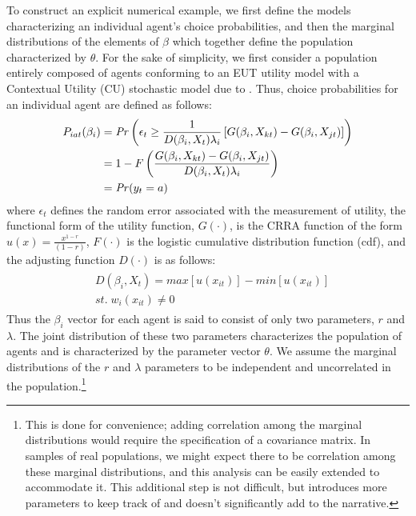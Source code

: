 \documentclass[../main.tex]{subfiles}
\begin{document}
To construct an explicit numerical example, we first define the models characterizing an individual agent's choice probabilities, and then the marginal distributions of the elements of $\beta$ which together define the population characterized by $\theta$.
For the sake of simplicity, we first consider a population entirely composed of agents conforming to an EUT utility model with a Contextual Utility (CU) stochastic model due to \textcite{Wilcox2008}.
Thus, choice probabilities for an individual agent are defined as follows:
\begin{align}
	\label{eq3:RE}
	\begin{split}
	P_{iat}(\beta_i) &= {\mathit{Pr}}\left(  \epsilon_t \geq \frac{1}{D(\beta_i,X_t) \lambda_i} \left[ G(\beta_i,X_{kt}) - G(\beta_i,X_{jt}) \right] \right)\\
	&= 1 - F\left( \dfrac{G(\beta_i,X_{kt}) - G(\beta_i,X_{jt})}{D(\beta_i,X_t)\lambda_i }  \right)\\
	&= {\mathit{Pr}}(y_t = a)
	\end{split}
\end{align}
\noindent where $\epsilon_t$ defines the random error associated with the measurement of utility, the functional form of the utility function, $G(\cdot)$, is the CRRA function of the form $u(x) = \frac{x^{1-r}}{(1-r)}$, $F(\cdot)$ is the logistic cumulative distribution function (cdf), and the adjusting function $D(\cdot)$ is as follows:
\begin{align}
	\label{eq3:CU}
	\begin{split}
		&D(\beta_i,X_t) = \mathit{max}[u(x_{it})] - \mathit{min}[u(x_{it})]\\
		&\mathit{st.}\; w_i(x_{it}) \neq 0
	\end{split}
\end{align}
\noindent Thus the $\beta_i$ vector for each agent is said to consist of only two parameters, $r$ and $\lambda$.
The joint distribution of these two parameters characterizes the population of agents and is characterized by the parameter vector $\theta$.
We assume the marginal distributions of the $r$ and $\lambda$ parameters to be independent and uncorrelated in the population.\footnote{
	This is done for convenience; adding correlation among the marginal distributions would require the specification of a covariance matrix.
	In samples of real populations, we might expect there to be correlation among these marginal distributions, and this analysis can be easily extended to accommodate it.
	This additional step is not difficult, but introduces more parameters to keep track of and doesn't significantly add to the narrative.
}
\end{document}
